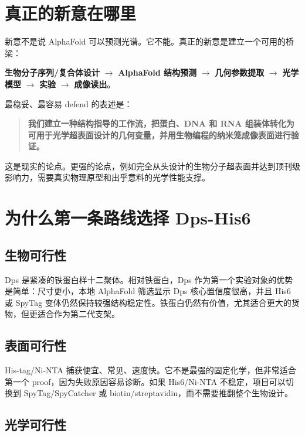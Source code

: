 \documentclass[11pt]{ctexart}
\newcommand{\af}{AlphaFold}
\begin{document}
\section{真正的新意在哪里}

新意不是说 \af{} 可以预测光谱。它不能。真正的新意是建立一个可用的桥梁：

\begin{center}
\textbf{生物分子序列/复合体设计} $\rightarrow$ \textbf{\af{} 结构预测} $\rightarrow$ \textbf{几何参数提取} $\rightarrow$ \textbf{光学模型} $\rightarrow$ \textbf{实验} $\rightarrow$ \textbf{成像读出}。
\end{center}

最稳妥、最容易 defend 的表述是：

\begin{quote}
\textbf{我们建立一种结构指导的工作流，把蛋白、DNA 和 RNA 组装体转化为可用于光学超表面设计的几何变量，并用生物编程的纳米笼成像表面进行验证。}
\end{quote}

这是现实的论点。更强的论点，例如完全从头设计的生物分子超表面并达到顶刊级影响力，需要真实物理原型和出乎意料的光学性能支撑。

\section{为什么第一条路线选择 Dps-His6}

\subsection{生物可行性}

Dps 是紧凑的铁蛋白样十二聚体。相对铁蛋白，Dps 作为第一个实验对象的优势是简单：尺寸更小，本地 \af{} 筛选显示 Dps 核心置信度很高，并且 His6 或 SpyTag 变体仍然保持较强结构稳定性。铁蛋白仍然有价值，尤其适合更大的货物，但更适合作为第二代支架。

\subsection{表面可行性}

His-tag/Ni-NTA 捕获便宜、常见、速度快。它不是最强的固定化学，但非常适合第一个 proof，因为失败原因容易诊断。如果 His6/Ni-NTA 不稳定，项目可以切换到 SpyTag/SpyCatcher 或 biotin/streptavidin，而不需要推翻整个生物设计。

\subsection{光学可行性}
\end{document}
